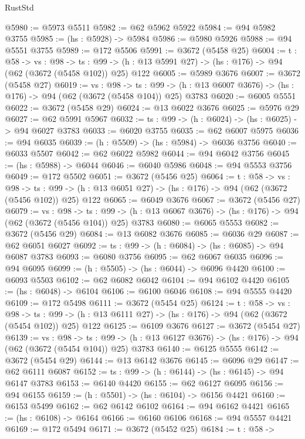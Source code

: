 \begin{lexlean}{RustStd}
\begin{coremodule}
@5980 := @5973 @5511
@5982 := @62 @5962 @5922
@5984 := @94 @5982 @3755
@5985 := (hs : @5928) -> @5984
@5986 := @5980 @5926
@5988 := @94 @5551 @3755
@5989 := @172 @5506
@5991 := @3672 (@5458 @25)
@6004 := {t : @58} ->
  {vs : @98} ->
  {ts : @99} -> (h : @13 @5991 @27) -> (hs : @176) -> @94 (@62 (@3672 (@5458 @102)) @25) @122
@6005 := @5989 @3676
@6007 := @3672 (@5458 @27)
@6019 := {vs : @98} ->
  {ts : @99} -> (h : @13 @6007 @3676) -> (hs : @176) -> @94 (@62 (@3672 (@5458 @104)) @25) @3783
@6020 := @6005 @5551
@6022 := @3672 (@5458 @29)
@6024 := @13 @6022 @3676
@6025 := @5976 @29
@6027 := @62 @5991 @5967
@6032 := {ts : @99} -> (h : @6024) -> (hs : @6025) -> @94 @6027 @3783
@6033 := @6020 @3755
@6035 := @62 @6007 @5975
@6036 := @94 @6035
@6039 := (h : @5509) -> (hs : @5984) -> @6036 @3756
@6040 := @6033 @5507
@6042 := @62 @6022 @5982
@6044 := @94 @6042 @3756
@6045 := (hs : @5988) -> @6044
@6046 := @6040 @5986
@6048 := @94 @5553 @3756
@6049 := @172 @5502
@6051 := @3672 (@5456 @25)
@6064 := {t : @58} ->
  {vs : @98} ->
  {ts : @99} -> (h : @13 @6051 @27) -> (hs : @176) -> @94 (@62 (@3672 (@5456 @102)) @25) @122
@6065 := @6049 @3676
@6067 := @3672 (@5456 @27)
@6079 := {vs : @98} ->
  {ts : @99} -> (h : @13 @6067 @3676) -> (hs : @176) -> @94 (@62 (@3672 (@5456 @104)) @25) @3783
@6080 := @6065 @5553
@6082 := @3672 (@5456 @29)
@6084 := @13 @6082 @3676
@6085 := @6036 @29
@6087 := @62 @6051 @6027
@6092 := {ts : @99} -> (h : @6084) -> (hs : @6085) -> @94 @6087 @3783
@6093 := @6080 @3756
@6095 := @62 @6067 @6035
@6096 := @94 @6095
@6099 := (h : @5505) -> (hs : @6044) -> @6096 @4420
@6100 := @6093 @5503
@6102 := @62 @6082 @6042
@6104 := @94 @6102 @4420
@6105 := (hs : @6048) -> @6104
@6106 := @6100 @6046
@6108 := @94 @5555 @4420
@6109 := @172 @5498
@6111 := @3672 (@5454 @25)
@6124 := {t : @58} ->
  {vs : @98} ->
  {ts : @99} -> (h : @13 @6111 @27) -> (hs : @176) -> @94 (@62 (@3672 (@5454 @102)) @25) @122
@6125 := @6109 @3676
@6127 := @3672 (@5454 @27)
@6139 := {vs : @98} ->
  {ts : @99} -> (h : @13 @6127 @3676) -> (hs : @176) -> @94 (@62 (@3672 (@5454 @104)) @25) @3783
@6140 := @6125 @5555
@6142 := @3672 (@5454 @29)
@6144 := @13 @6142 @3676
@6145 := @6096 @29
@6147 := @62 @6111 @6087
@6152 := {ts : @99} -> (h : @6144) -> (hs : @6145) -> @94 @6147 @3783
@6153 := @6140 @4420
@6155 := @62 @6127 @6095
@6156 := @94 @6155
@6159 := (h : @5501) -> (hs : @6104) -> @6156 @4421
@6160 := @6153 @5499
@6162 := @62 @6142 @6102
@6164 := @94 @6162 @4421
@6165 := (hs : @6108) -> @6164
@6166 := @6160 @6106
@6168 := @94 @5557 @4421
@6169 := @172 @5494
@6171 := @3672 (@5452 @25)
@6184 := {t : @58} ->

\end{coremodule}
\end{lexlean}
